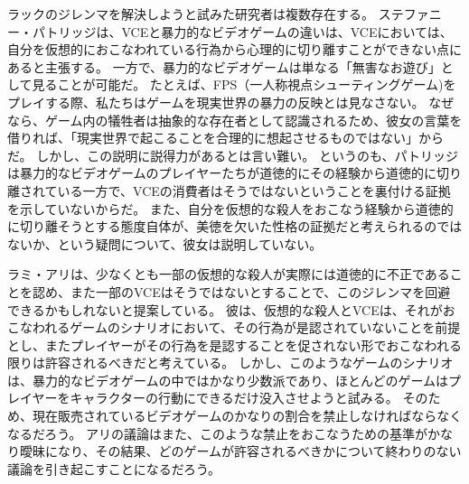 \documentclass[paper=a4,book,openany]{jlreq}
\begin{document}
ラックのジレンマを解決しようと試みた研究者は複数存在する。
ステファニー・パトリッジは、VCEと暴力的なビデオゲームの違いは、VCEにおいては、自分を仮想的におこなわれている行為から心理的に切り離すことができない点にあると主張する。
一方で、暴力的なビデオゲームは単なる「無害なお遊び」として見ることが可能だ。
たとえば、FPS（一人称視点シューティングゲーム)をプレイする際、私たちはゲームを現実世界の暴力の反映とは見なさない。
なぜなら、ゲーム内の犠牲者は抽象的な存在者として認識されるため、彼女の言葉を借りれば、「現実世界で起こることを合理的に想起させるものではない」からだ\citep[p.33]{patridge13:_pornog_ethic_video_games}。
しかし、この説明に説得力があるとは言い難い。
というのも、パトリッジは暴力的なビデオゲームのプレイヤーたちが道徳的にその経験から道徳的に切り離されている一方で、VCEの消費者はそうではないということを裏付ける証拠を示していないからだ。
また、自分を仮想的な殺人をおこなう経験から道徳的に切り離そうとする態度自体が、美徳を欠いた性格の証拠だと考えられるのではないか、という疑問について、彼女は説明していない。

ラミ・アリは、少なくとも一部の仮想的な殺人が実際には道徳的に不正であることを認め、また一部のVCEはそうではないとすることで、このジレンマを回避できるかもしれないと提案している。
彼は、仮想的な殺人とVCEは、それがおこなわれるゲームのシナリオにおいて、その行為が是認されていないことを前提とし、またプレイヤーがその行為を是認することを促されない形でおこなわれる限りは許容されるべきだと考えている\citep{ali15:_new_solut_gamer_dilem}。
しかし、このようなゲームのシナリオは、暴力的なビデオゲームの中ではかなり少数派であり、ほとんどのゲームはプレイヤーをキャラクターの行動にできるだけ没入させようと試みる。
そのため、現在販売されているビデオゲームのかなりの割合を禁止しなければならなくなるだろう。
アリの議論はまた、このような禁止をおこなうための基準がかなり曖昧になり、その結果、どのゲームが許容されるべきかについて終わりのない議論を引き起こすことになるだろう。
\end{document}
